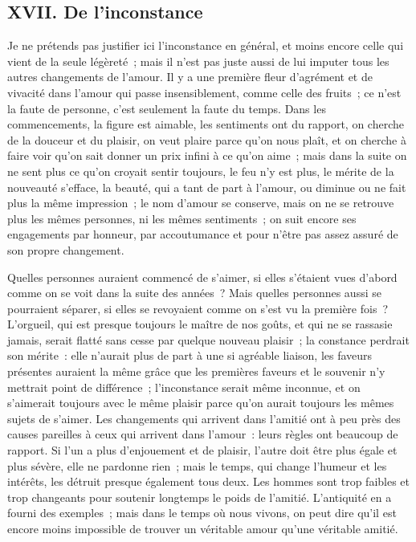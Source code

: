 \documentclass[french,twoside]{book} %
\begin{document}
\subsection[{XVII. De l’inconstance}]{XVII. De l’inconstance}
\noindent Je ne prétends pas justifier ici l’inconstance en général, et moins encore celle qui vient de la seule légèreté ; mais il n’est pas juste aussi de lui imputer tous les autres changements de l’amour. Il y a une première fleur d’agrément et de vivacité dans l’amour qui passe insensiblement, comme celle des fruits ; ce n’est la faute de personne, c’est seulement la faute du temps. Dans les commencements, la figure est aimable, les sentiments ont du rapport, on cherche de la douceur et du plaisir, on veut plaire parce qu’on nous plaît, et on cherche à faire voir qu’on sait donner un prix infini à ce qu’on aime ; mais dans la suite on ne sent plus ce qu’on croyait sentir toujours, le feu n’y est plus, le mérite de la nouveauté s’efface, la beauté, qui a tant de part à l’amour, ou diminue ou ne fait plus la même impression ; le nom d’amour se conserve, mais on ne se retrouve plus les mêmes personnes, ni les mêmes sentiments ; on suit encore ses engagements par honneur, par accoutumance et pour n’être pas assez assuré de son propre changement.\par
Quelles personnes auraient commencé de s’aimer, si elles s’étaient vues d’abord comme on se voit dans la suite des années ? Mais quelles personnes aussi se pourraient séparer, si elles se revoyaient comme on s’est vu la première fois ? L’orgueil, qui est presque toujours le maître de nos goûts, et qui ne se rassasie jamais, serait flatté sans cesse par quelque nouveau plaisir ; la constance perdrait son mérite : elle n’aurait plus de part à une si agréable liaison, les faveurs présentes auraient la même grâce que les premières faveurs et le souvenir n’y mettrait point de différence ; l’inconstance serait même inconnue, et on s’aimerait toujours avec le même plaisir parce qu’on aurait toujours les mêmes sujets de s’aimer. Les changements qui arrivent dans l’amitié ont à peu près des causes pareilles à ceux qui arrivent dans l’amour : leurs règles ont beaucoup de rapport. Si l’un a plus d’enjouement et de plaisir, l’autre doit être plus égale et plus sévère, elle ne pardonne rien ; mais le temps, qui change l’humeur et les intérêts, les détruit presque également tous deux. Les hommes sont trop faibles et trop changeants pour soutenir longtemps le poids de l’amitié. L’antiquité en a fourni des exemples ; mais dans le temps où nous vivons, on peut dire qu’il est encore moins impossible de trouver un véritable amour qu’une véritable amitié.
\end{document}
